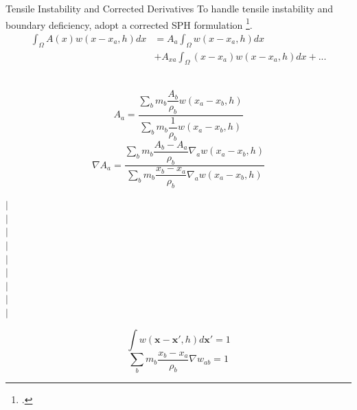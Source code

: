 \documentclass{beamer}
\begin{document}
\begin{frame}{Tensile Instability and Corrected Derivatives}
To handle tensile instability and boundary deficiency, adopt a corrected SPH formulation \footcite{chen1999improvement}.
\begin{equation}
\begin{split}
\int_{\Omega} A\left(x\right) w\left(x- x_a, h\right) dx &= 
A_a \int_{\Omega} w\left(x - x_a, h\right) dx \\  & +A_{xa} \int_{\Omega} \left(x-x_a\right) w\left(x - x_a, h\right) dx +...
\end{split}
\end{equation}
\\
\noindent
\begin{minipage}{0.99 \textwidth}
\begin{minipage}{0.60 \textwidth}
\begin{equation}
A_a = \frac{\sum_b m_b \dfrac{A_b}{\rho_b} w\left(x_a-x_b, h\right)}{\sum_b m_b \dfrac{1}{\rho_b} w\left(x_a-x_b, h\right)}
\label{eq:CSP-function-approximation-1d}
\end{equation}
\begin{equation}
\nabla A_a = \frac{\sum_b m_b \dfrac{A_b - A_a}{\rho_b} \nabla_a w\left(x_a-x_b, h\right)}{\sum_b m_b \dfrac{x_b - x_a}{\rho_b} \nabla_a w\left(x_a-x_b, h\right)}
\end{equation}
\end{minipage}
\begin{minipage}{.01\textwidth}
$\vert$\\
$\vert$\\
$\vert$\\
$\vert$\\
$\vert$\\
$\vert$\\
$\vert$\\
$\vert$\\
$\vert$\\
\end{minipage}
\begin{minipage}{0.37 \textwidth}
\begin{equation}
\int	 w\left(\textbf{x}-\textbf{x}\prime, h\right) d\textbf{x}\prime = 1
\label{eq:SPH-kernel-normalization-prop}
\end{equation}
\begin{equation}
\sum_b m_b \dfrac{x_b - x_a}{\rho_b} \nabla w_{ab} = 1 
\label{eq:SPH-kernel-normalization-prop}
\end{equation}
\end{minipage}
%
\end{minipage}
%
\end{frame}
\end{document}
